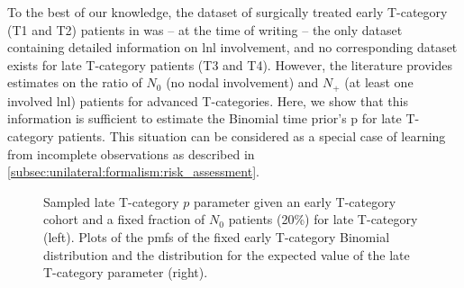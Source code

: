\documentclass[\relativeRoot/main.tex]{subfiles}
\begin{document}
To the best of our knowledge, the dataset of surgically treated early T-category (T1 and T2) patients in \cite{sanguineti_defining_2009} was -- at the time of writing \cite{ludwig_hidden_2021} -- the only dataset containing detailed information on \gls{lnl} involvement, and no corresponding dataset exists for late T-category patients (T3 and T4). However, the literature provides estimates on the ratio of $N_0$ (no nodal involvement) and $N_+$ (at least one involved \gls{lnl}) patients for advanced T-categories. Here, we show that this information is sufficient to estimate the Binomial time prior's p for late T-category patients. This situation can be considered as a special case of learning from incomplete observations as described in \cref{subsec:unilateral:formalism:risk_assessment}.

\begin{figure}
    \centering
    \def\svgwidth{1.0\textwidth}
    
    \caption{Sampled late T-category $p$ parameter given an early T-category cohort and a fixed fraction of $N_0$ patients (20\%) for late T-category (left). Plots of the \glspl{pmf} of the fixed early T-category Binomial distribution and the distribution for the expected value of the late T-category parameter (right).}
    \label{fig:unilateral:simultaneous_learned}
\end{figure}
\end{document}
